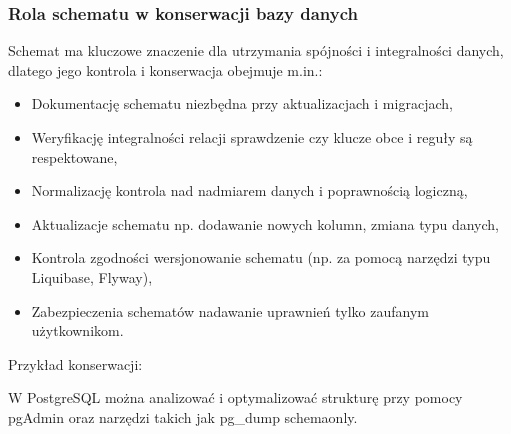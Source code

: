 \documentclass[a4paper,11pt,openany,english]{sphinxmanual}
\begin{document}
\subsubsection{Rola schematu w konserwacji bazy danych}
\label{\detokenize{rozdzial2/Kontrola_i_konserwacja/kontrola_i_konserwacja:rola-schematu-w-konserwacji-bazy-danych}}
\sphinxAtStartPar
Schemat ma kluczowe znaczenie dla utrzymania spójności i integralności danych, dlatego jego kontrola i konserwacja obejmuje m.in.:
\begin{itemize}
\item {} 
\sphinxAtStartPar
Dokumentację schematu \sphinxhyphen{} niezbędna przy aktualizacjach i migracjach,

\item {} 
\sphinxAtStartPar
Weryfikację integralności relacji \sphinxhyphen{} sprawdzenie czy klucze obce i reguły są respektowane,

\item {} 
\sphinxAtStartPar
Normalizację \sphinxhyphen{} kontrola nad nadmiarem danych i poprawnością logiczną,

\item {} 
\sphinxAtStartPar
Aktualizacje schematu \sphinxhyphen{} np. dodawanie nowych kolumn, zmiana typu danych,

\item {} 
\sphinxAtStartPar
Kontrola zgodności \sphinxhyphen{} wersjonowanie schematu (np. za pomocą narzędzi typu Liquibase, Flyway),

\item {} 
\sphinxAtStartPar
Zabezpieczenia schematów \sphinxhyphen{} nadawanie uprawnień tylko zaufanym użytkownikom.

\end{itemize}

\sphinxAtStartPar
Przykład konserwacji:

\sphinxAtStartPar
W PostgreSQL można analizować i optymalizować strukturę przy pomocy pgAdmin oraz narzędzi takich jak pg\_dump \textendash{}schema\sphinxhyphen{}only.
\end{document}
